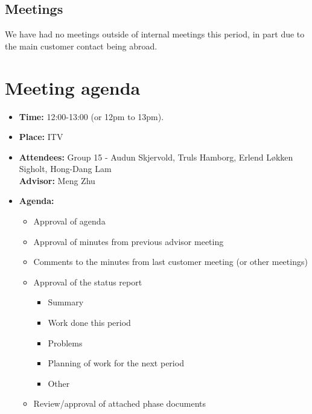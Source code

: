 \documentclass[12pt, a4paper]{article}
\begin{document}
\subsection{Meetings}
We have had no meetings outside of internal meetings this period, in part due to the main customer contact
being abroad.
\newpage
\section{Meeting agenda }
\begin{itemize}
\item \textbf{Time:} 12:00-13:00 (or 12pm to 13pm).
\item \textbf{Place:} ITV
\item \textbf{Attendees:} Group 15 -
     Audun Skjervold, Truls Hamborg, Erlend Løkken Sigholt, Hong-Dang Lam \\ \textbf{Advisor:} Meng Zhu
\item \textbf{Agenda:} 
	\begin{itemize}
	\item Approval of agenda
	\item Approval of minutes from previous advisor meeting
	\item Comments to the minutes from last customer meeting (or other meetings)
	\item Approval of the status report
		\begin{itemize}
		\item Summary
		\item Work done this period
		\item Problems
		\item Planning of work for the next period
		\item Other
	\end{itemize}
	\item Review/approval of attached phase documents
	\end{itemize}
\end{itemize}
\end{document}
